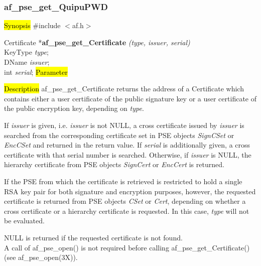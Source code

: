 \subsubsection{af\_pse\_get\_QuipuPWD}
\label{af_get_Certificate}
\hl{Synopsis}
\#include $<$af.h$>$

Certificate *{\bf af\_pse\_get\_Certificate} {\em (type, issuer, serial)} \\
KeyType {\em type}; \\
DName	{\em *issuer}; \\
int	{\em serial};
\hl{Parameter}



\hl{Description}
af\_pse\_get\_Certificate returns the address of a Certificate which contains
either a user certificate of the public signature key 
or a user certificate of the public encryption key, depending on {\em type}. 

If {\em issuer} is given, i.e. {\em issuer} is not NULL, a cross certificate issued
by {\em issuer} is searched from the corresponding certificate set in PSE objects 
{\em SignCSet} or {\em EncCSet} and returned in the return value. 
If {\em serial} is additionally given, a cross
certificate with that serial number is searched. Otherwise, if {\em issuer}
is NULL, the hierarchy certificate from PSE objects {\em SignCert} or {\em EncCert}
is returned.

If the PSE from which the certificate is retrieved is restricted to hold a single RSA key pair
for both signature and encryption purposes, however, the requested certificate is returned
from PSE objects {\em CSet} or {\em Cert}, depending on whether a cross certificate or a hierarchy
certificate is requested. In this case, {\em type} will not be evaluated.

NULL is returned if the requested certificate is not found.
\\ [1em]
A call of af\_pse\_open() is not required before calling af\_pse\_get\_Certificate()
(see af\_pse\_open(3X)).

